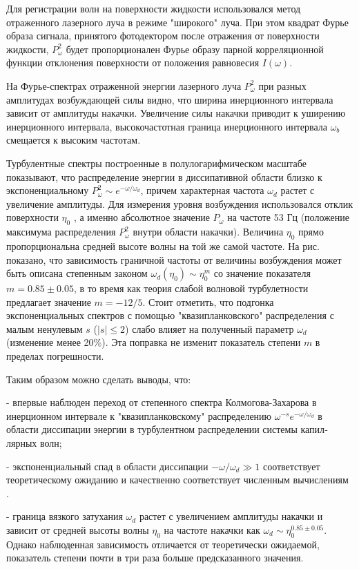 Для регистрации волн на поверхности жидкости использовался метод отраженного лазерного луча \cite{Brazhnikov_IET} в режиме "широкого"{} луча. При этом квадрат Фурье образа сигнала, принятого фотодектором после отражения от поверхности жидкости, $P_\omega^2$ будет пропорционален Фурье образу парной корреляционной функции отклонения поверхности от положения равновесия $I(\omega)$.

На Фурье-спек­трах отраженной энергии лазерного луча $P_\omega^2$ при разных амплитудах воз­буждающей силы видно, что ширина инерционного интервала зависит от амплитуды накачки. Увеличение силы накачки приводит к уширению инерционного интервала, высокочастотная граница инерционного интервала $\omega_b$ смещается к высоким частотам. 

Турбулентные спектры построенные в полулогарифмическом масштабе показывают, что распределение энергии в диссипативной области близко к экспоненциальному $P_\omega^2 \sim e^{-\omega/ \omega_d}$, причем характерная частота $\omega_d$ растет с увеличение амплитуды.
Для измерения уровня возбуждения использовался отклик поверхности $\eta_0$ , а именно абсолютное значение $P_\omega$ на частоте 53 Гц (положение максимума распределения $P_\omega^2$ внутри области накачки). Величина $\eta_0$ прямо пропорциональна средней высоте волны на той же самой частоте. На рис.  показано, что зависимость граничной частоты от величины возбуждения может быть описана степенным законом $\omega_d(\eta_0) \sim \eta_0^m$ со значение показателя $m = 0.85 \pm 0.05$, в то время как теория слабой волновой турбулетности предлагает значение $m = -12/5$. Стоит отметить, что подгонка экспоненциальных спектров с помощью "квазипланковского"{} распределения с малым ненулевым $s$ ($\vert s \vert \leq 2$) слабо влияет на полученный параметр $\omega_d$ (изменение менее 20\%). Эта поправка не изменит показатель степени $m$ в пределах погрешности.

Таким образом можно сделать выводы, что:

 - впервые наблюден переход от степенного спектра Колмогова-Захарова
в инерционном интервале к "квазипланковскому"{} распределению $\omega^{-s} e^{-\omega/\omega_d}$ в области диссипации энергии в турбулентном распределении системы капил­лярных волн;

- экспоненциальный спад в области диссипации $-\omega/ \omega_d \gg 1$ соответствует теоретическому ожиданию и качественно соответствует численным вычислениям \cite{Ryzhenkova1990}.
 
- граница вязкого затухания $\omega_d$ растет с увеличением амплитуды накачки и зависит от средней высоты волны $\eta_0$ на частоте накачки как $\omega_d \sim \eta_0^{0.85 \pm 0.05}$. Однако наблюденная зависимость отличается от теоретически ожидаемой, показатель степени почти в три раза больше предсказанного значе­ния.

